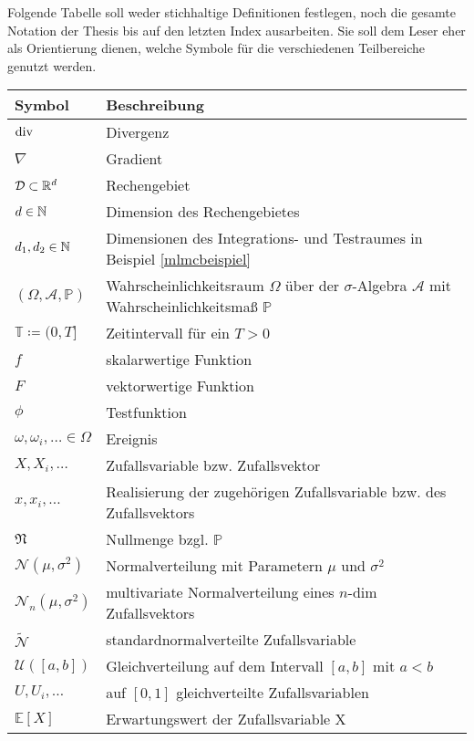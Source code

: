Folgende Tabelle soll weder stichhaltige Definitionen festlegen, noch die gesamte Notation der Thesis bis auf den letzten Index ausarbeiten. Sie soll dem Leser eher als Orientierung dienen, welche Symbole für die verschiedenen Teilbereiche genutzt werden.

\begin{longtable}[c]{ p{} p{}}
	\hline
	Symbol    & Beschreibung   \\
	\hline
	$ \operatorname{div} $ & Divergenz \\
	$ \nabla $ & Gradient \\
	$ \mathcal{D} \subset \mathbb{R}^d$      & Rechengebiet       \\
	$ d \in \mathbb{N} $      & Dimension des Rechengebietes        \\
	$ d_1, d_2 \in \mathbb{N} $ & Dimensionen des Integrations- und Testraumes in Beispiel \ref{mlmcbeispiel}  \\
	$ (\Omega,\mathcal{A},\mathbb{P}) $       & Wahrscheinlichkeitsraum $ \Omega $ über der $ \sigma $-Algebra $ \mathcal{A} $ mit Wahrscheinlichkeitsmaß $ \mathbb{P} $       \\
	$ \mathbb{T} \coloneqq  (0,T]  $  &  Zeitintervall für ein $ T>0 $       \\
	$ f $ & skalarwertige Funktion \\
	$ F $ & vektorwertige Funktion \\
	$ \phi $ & Testfunktion \\
	$ \omega ,\omega_i , \dots \in \Omega $ & Ereignis \\
	$ X , X_i , \dots $ & Zufallsvariable bzw. Zufallsvektor \\
	$ x , x_i , \dots $ & Realisierung der zugehörigen Zufallsvariable bzw. des Zufallsvektors \\
	$ \mathfrak{N} $ & Nullmenge bzgl. $ \mathbb{P} $ \\
	$ \mathcal{N}(\mu,\sigma^2) $ & Normalverteilung mit Parametern $ \mu $ und $ \sigma^2 $ \\
	$ \mathcal{N}_n(\mu,\sigma^2) $ & multivariate Normalverteilung eines $ n $-dim Zufallsvektors\\
	$\widetilde{\mathcal{N}}$ & standardnormalverteilte Zufallsvariable \\
	$ \mathcal{U}([a,b]) $ & Gleichverteilung auf dem Intervall $ [a,b] $ mit $ a<b $ \\
	$ U,U_i,\dots $ &  auf $ [0,1] $  gleichverteilte Zufallsvariablen \\
	$ \mathbb{E}[X] $ & Erwartungswert der Zufallsvariable X \\

\end{longtable}
